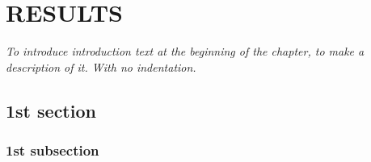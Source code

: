 
\chapter{RESULTS} %
\label{Results}

\vspace*{3\baselineskip} %

\noindent \textit{To introduce introduction text at the beginning of the chapter, to make a description of it. With no indentation.}

\section{1st section}

\blindtext

\subsection{1st subsection}